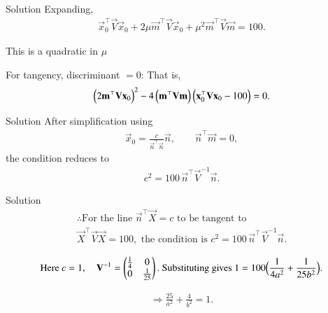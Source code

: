 \documentclass{beamer}
\begin{document}
\begin{frame}{Solution}
Expanding,
\begin{align}
\vec{x}_0^\top \vec{V}\vec{x}_0
+ 2\mu \vec{m}^\top \vec{V}\vec{x}_0
+ \mu^2 \vec{m}^\top \vec{V}\vec{m} = 100.
\end{align}

This is a quadratic in $\mu$

For tangency, discriminant $=0$:
That is,
\begin{align}
\left(2\mathbf{m}^\top \mathbf{V}\mathbf{x}_0\right)^2
- 4\left(\mathbf{m}^\top \mathbf{V}\mathbf{m}\right)
\left(\mathbf{x}_0^\top \mathbf{V}\mathbf{x}_0 - 100\right) = 0.
\end{align}
\end{frame}
\begin{frame}{Solution}
After simplification using
\begin{align}
\vec{x}_0 = \frac{c}{\vec{n}^\top \vec{n}} \vec{n}, \qquad 
\vec{n}^\top \vec{m} = 0,
\end{align}
the condition reduces to
\begin{align}
c^2 = 100 \,\vec{n}^\top \vec{V}^{-1}\vec{n}.
\end{align}
\end{frame}
\begin{frame}{Solution}
\begin{align*}
\therefore\text{For the line } \vec{n}^\top\vec{X}=c \text{ to be tangent to } \\
\vec{X}^\top\vec{V}\vec{X}=100,\text{ the condition is } 
c^2 = 100\,\vec{n}^\top\vec{V}^{-1}\vec{n}.
\end{align*}

\begin{align}
\text{Here } c=1,\quad
\mathbf{V}^{-1}=\begin{pmatrix}\tfrac{1}{4} & 0 \\ 0 & \tfrac{1}{25}\end{pmatrix}.
\text{ Substituting gives }
1 = 100\Big(\frac{1}{4a^2}+\frac{1}{25b^2}\Big).
\end{align}

\begin{align}
\Rightarrow \frac{25}{a^2}+\frac{4}{b^2}=1.
\end{align}
\end{frame}
\end{document}
